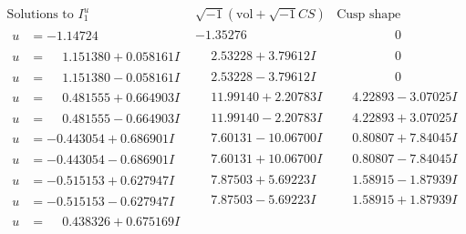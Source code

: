 \documentclass[1p]{elsarticle_modified}
\theoremstyle{definition}
\newcommand{\I}{\sqrt{-1}}
\begin{document}
$$\begin{array}{c|c|c}  
\text{Solutions to }I^u_{1}& \I (\text{vol} + \sqrt{-1}CS) & \text{Cusp shape}\\
 \hline 
\begin{aligned}
u &= -1.14724\phantom{ +0.000000I}\end{aligned}
 & -1.35276\phantom{ +0.000000I} & \phantom{-0.000000 } 0 \\ \hline\begin{aligned}
u &= \phantom{-}1.151380 + 0.058161 I\end{aligned}
 & \phantom{-}2.53228 + 3.79612 I & \phantom{-0.000000 } 0 \\ \hline\begin{aligned}
u &= \phantom{-}1.151380 - 0.058161 I\end{aligned}
 & \phantom{-}2.53228 - 3.79612 I & \phantom{-0.000000 } 0 \\ \hline\begin{aligned}
u &= \phantom{-}0.481555 + 0.664903 I\end{aligned}
 & \phantom{-}11.99140 + 2.20783 I & \phantom{-}4.22893 - 3.07025 I \\ \hline\begin{aligned}
u &= \phantom{-}0.481555 - 0.664903 I\end{aligned}
 & \phantom{-}11.99140 - 2.20783 I & \phantom{-}4.22893 + 3.07025 I \\ \hline\begin{aligned}
u &= -0.443054 + 0.686901 I\end{aligned}
 & \phantom{-}7.60131 - 10.06700 I & \phantom{-}0.80807 + 7.84045 I \\ \hline\begin{aligned}
u &= -0.443054 - 0.686901 I\end{aligned}
 & \phantom{-}7.60131 + 10.06700 I & \phantom{-}0.80807 - 7.84045 I \\ \hline\begin{aligned}
u &= -0.515153 + 0.627947 I\end{aligned}
 & \phantom{-}7.87503 + 5.69223 I & \phantom{-}1.58915 - 1.87939 I \\ \hline\begin{aligned}
u &= -0.515153 - 0.627947 I\end{aligned}
 & \phantom{-}7.87503 - 5.69223 I & \phantom{-}1.58915 + 1.87939 I \\ \hline\begin{aligned}
u &= \phantom{-}0.438326 + 0.675169 I\end{aligned}

\end{array}$$
\end{document}
